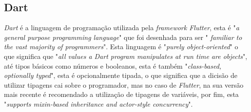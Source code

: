 \subsection{Dart}
\textit{Dart} é a linguagem de programação utilizada pela \textit{framework Flutter}, esta é "\emph{a general purpose programming language}"\citep{dart_pg_lang} que foi desenhada para ser "\emph{ familiar to the vast majority of programmers}"\citep{dart_pg_lang}. Esta linguagem é "\emph{purely object-oriented}" o que significa que "\emph{all values a Dart program manipulates at run time are objects}"\citep{dart_pg_lang}, até tipos básicos como números e booleanos, esta é também "\emph{class-based, optionally typed}"\citep{dart_pg_lang}, esta é opcionalmente tipada, o que significa que a dicisão de utilizar tipagens cai sobre o programador, mas no caso de \textit{Flutter}, na sua versão mais recente é recomendado a utilização de tipagens de variáveis, por fim, esta "\emph{supports mixin-based inheritance and actor-style concurrency}"\citep{dart_pg_lang}.